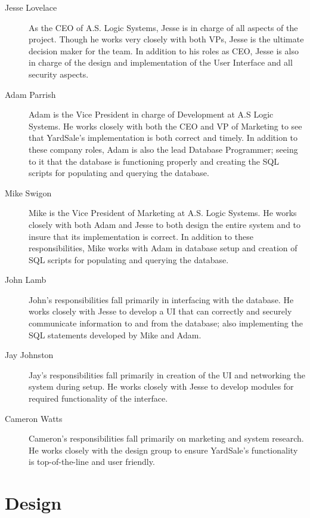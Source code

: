 \documentclass{report}
\begin{document}
    \begin{description}
        \item[Jesse Lovelace] As the CEO of A.S. Logic Systems,
        Jesse is in charge of all aspects of the project.  Though
        he works very closely with both VPs, Jesse is the ultimate
        decision maker for the team.  In addition to his roles as
        CEO, Jesse is also in charge of the design and
        implementation of the User Interface and all security
        aspects.
        \item[Adam Parrish] Adam is the Vice President in charge
        of Development at A.S Logic Systems.  He works closely
        with both the CEO and VP of Marketing to see that
        YardSale's implementation is both correct and timely.  In
        addition to these company roles, Adam is also the lead
        Database Programmer; seeing to it that the database is
        functioning properly and creating the SQL scripts for
        populating and querying the database.
        \item[Mike Swigon] Mike is the Vice President of
        Marketing at A.S. Logic Systems.  He works closely with
        both Adam and Jesse to both design the entire system and
        to insure that its implementation is correct.  In addition
        to these responsibilities, Mike works with Adam in database
        setup and creation of SQL scripts for populating and
        querying the database.
        \item[John Lamb] John's responsibilities fall primarily in
        interfacing with the database.  He works closely with Jesse
        to develop a UI that can correctly and securely
        communicate information to and from the database; also
        implementing the SQL statements developed by Mike and
        Adam.
        \item[Jay Johnston] Jay's responsibilities fall primarily
        in creation of the UI and networking the system during
        setup.  He works closely with Jesse to develop modules
        for required functionality of the interface.
        \item[Cameron Watts] Cameron's responsibilities fall
        primarily on marketing and system research.  He works
        closely with the design group to ensure YardSale's
        functionality is top-of-the-line and user friendly.
    \end{description}


\chapter{Design}
\end{document}
